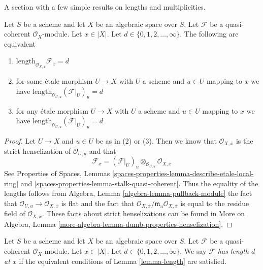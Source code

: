 \noindent
A section with a few simple results on lengths and multiplicities.

\begin{lemma}
\label{lemma-length}
Let $S$ be a scheme and let $X$ be an algebraic space over $S$.
Let $\mathcal{F}$ be a quasi-coherent $\mathcal{O}_X$-module.
Let $x \in |X|$. Let $d \in \{0, 1, 2, \ldots, \infty\}$.
The following are equivalent
\begin{enumerate}
\item
$\text{length}_{\mathcal{O}_{X, \overline{x}}} \mathcal{F}_{\overline{x}} = d$
\item for some \'etale morphism $U \to X$ with $U$ a scheme
and $u \in U$ mapping to $x$ we have
$\text{length}_{\mathcal{O}_{U, u}} (\mathcal{F}|_U)_u = d$
\item for any \'etale morphism $U \to X$ with $U$ a scheme
and $u \in U$ mapping to $x$ we have
$\text{length}_{\mathcal{O}_{U, u}} (\mathcal{F}|_U)_u = d$
\end{enumerate}
\end{lemma}

\begin{proof}
Let $U \to X$ and $u \in U$ be as in (2) or (3). Then we know that
$\mathcal{O}_{X, \overline{x}}$ is the strict henselization of
$\mathcal{O}_{U, u}$ and that
$$
\mathcal{F}_{\overline{x}} =
(\mathcal{F}|_U)_u \otimes_{\mathcal{O}_{U, u}} \mathcal{O}_{X, \overline{x}}
$$
See Properties of Spaces,
Lemmas \ref{spaces-properties-lemma-describe-etale-local-ring} and
\ref{spaces-properties-lemma-stalk-quasi-coherent}.
Thus the equality of the lengths follows from
Algebra, Lemma \ref{algebra-lemma-pullback-module}
the fact that $\mathcal{O}_{U, u} \to \mathcal{O}_{X, \overline{x}}$
is flat and the fact that
$\mathcal{O}_{X, \overline{x}}/\mathfrak m_u\mathcal{O}_{X, \overline{x}}$
is equal to the residue field of $\mathcal{O}_{X, \overline{x}}$.
These facts about strict henselizations can be found in
More on Algebra, Lemma \ref{more-algebra-lemma-dumb-properties-henselization}.
\end{proof}

\begin{definition}
\label{definition-length-at-x}
Let $S$ be a scheme and let $X$ be an algebraic space over $S$.
Let $\mathcal{F}$ be a quasi-coherent $\mathcal{O}_X$-module.
Let $x \in |X|$. Let $d \in \{0, 1, 2, \ldots, \infty\}$.
We say {\it $\mathcal{F}$ has length $d$ at $x$}
if the equivalent conditions of Lemma \ref{lemma-length}
are satisfied.
\end{definition}

